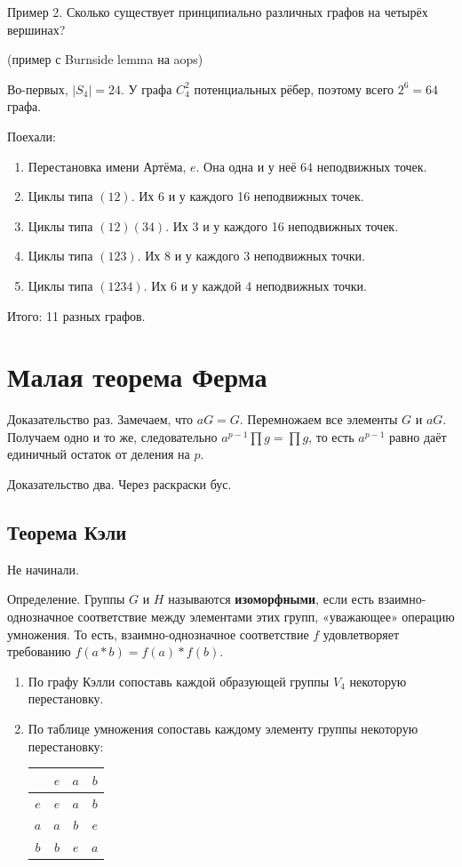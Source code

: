 \documentclass[12pt]{article} %
\begin{document}
Пример 2. Сколько существует принципиально различных графов на четырёх вершинах?

(пример с Burnside lemma на aops)


Во-первых, $|S_4|=24$. У графа $C_4^2$ потенциальных рёбер, поэтому всего $2^6=64$ графа.

Поехали:
\begin{enumerate}
\item Перестановка имени Артёма, $e$. Она одна и у неё $64$ неподвижных точек.
\item Циклы типа $(12)$. Их 6 и у каждого 16 неподвижных точек.
\item Циклы типа $(12)(34)$. Их 3 и у каждого 16 неподвижных точек.
\item Циклы типа $(123)$. Их 8 и у каждого 3 неподвижных точки.
\item Циклы типа $(1234)$. Их 6 и у каждой 4 неподвижных точки.
\end{enumerate}

Итого: 11 разных графов.


\section{Малая теорема Ферма}

Доказательство раз. Замечаем, что $aG=G$. Перемножаем все элементы $G$ и $aG$. Получаем одно и то же, следовательно $a^{p-1}\prod g = \prod g$, то есть $a^{p-1}$ равно даёт единичный остаток от деления на $p$.


Доказательство два. Через раскраски бус.



\subsection{Теорема Кэли}

Не начинали.

Определение. Группы $G$ и $H$ называются \textbf{изоморфными}, если есть взаимно-однозначное соответствие между элементами этих групп, «уважающее» операцию умножения. То есть, взаимно-однозначное соответствие $f$ удовлетворяет требованию $f(a * b) = f(a) * f(b)$.


\begin{enumerate}[resume]
  \item По графу Кэлли сопоставь каждой образующей группы $V_4$ некоторую перестановку.
  \item По таблице умножения сопоставь каждому элементу группы некоторую перестановку:
  \begin{tabular}{c|c|c|c}
       & $e$ & $a$ & $b$\\
  \midrule
  $e$  &  $e$ & $a$ & $b$ \\
  \midrule
  $a$  &  $a$ &  $b$  & $e$ \\
  \midrule
  $b$  &  $b$ & $e$  &  $a$ \\
  \midrule
  \end{tabular}


\end{enumerate}
\end{document}
